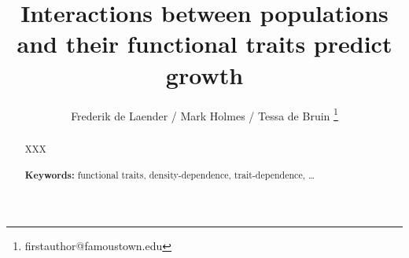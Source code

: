 \title{Interactions between populations and their functional traits predict growth}
\author[1,2]{Frederik de Laender / Mark Holmes / Tessa de Bruin \thanks{firstauthor@famoustown.edu}}

\maketitle
\begin{abstract}
\noindent XXX
\\\\
\textbf{Keywords:} functional traits, density-dependence, trait-dependence, \dots

\end{abstract}
